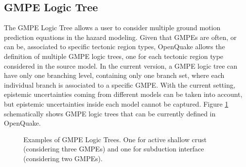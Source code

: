 \subsection{GMPE Logic Tree}
\label{hazard:gmpe_logic_tree}
The GMPE Logic Tree allows a user to consider multiple ground motion prediction
equations in the hazard modeling. Given that GMPEs are often, or can be, 
associated to specific tectonic region types, OpenQuake allows the definition 
of multiple GMPE logic trees, one for each tectonic region type considered in 
the source model. In the current version, a GMPE logic tree can have only one 
branching level, containing only one branch set, where each individual branch 
is associated to a specific GMPE. With the current setting, epistemic 
uncertainties coming from different models can be taken into account, but 
epistemic uncertainties inside each model cannot be captured.
Figure \ref{fig:GMPELogicTree} schematically shows GMPE logic trees that can 
be currently defined in OpenQuake.
\renewcommand{\psedge}{\ncdiag[armA=0,angleB=180,armB=1cm]}
\begin{figure}

\caption{Examples of GMPE Logic Trees. One for active shallow crust (considering
three GMPEs) and one for subduction interface (considering two GMPEs).}
\label{fig:GMPELogicTree}
\end{figure}

